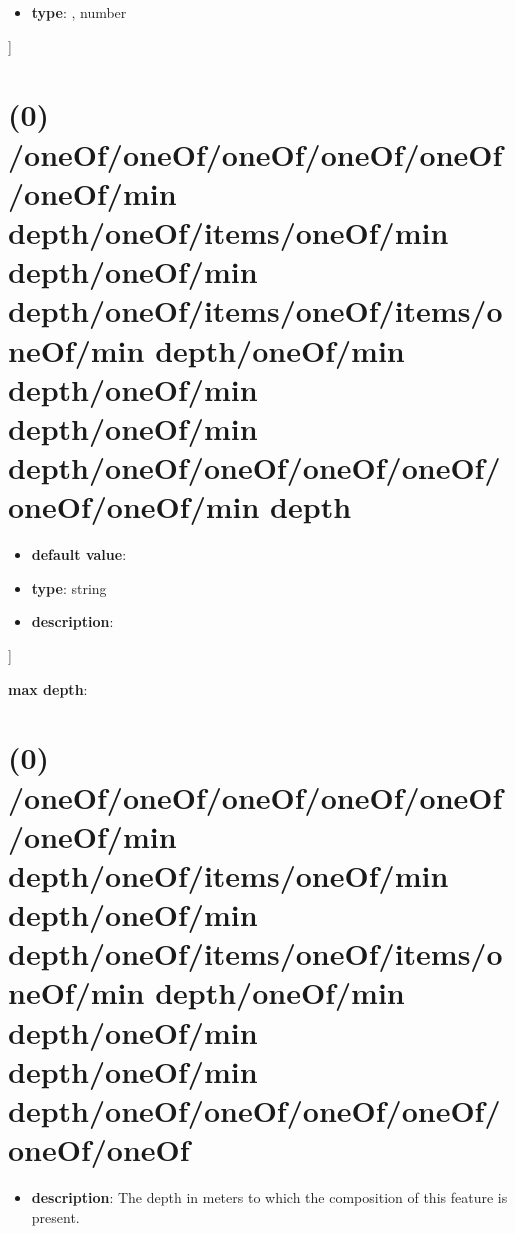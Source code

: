 \begin{itemize}[leftmargin=5em]\item {\bf type}: , number\end{itemize}]\section{(0) /oneOf/oneOf/oneOf/oneOf/oneOf/oneOf/min depth/oneOf/items/oneOf/min depth/oneOf/min depth/oneOf/items/oneOf/items/oneOf/min depth/oneOf/min depth/oneOf/min depth/oneOf/min depth/oneOf/oneOf/oneOf/oneOf/oneOf/oneOf/min depth}
\begin{itemize}[leftmargin=0em]\item {\bf default value}: 
\item {\bf type}: string
\item {\bf description}: 
\end{itemize}]\item {\bf max depth}: \section{(0) /oneOf/oneOf/oneOf/oneOf/oneOf/oneOf/min depth/oneOf/items/oneOf/min depth/oneOf/min depth/oneOf/items/oneOf/items/oneOf/min depth/oneOf/min depth/oneOf/min depth/oneOf/min depth/oneOf/oneOf/oneOf/oneOf/oneOf/oneOf}
\begin{itemize}[leftmargin=0em]\item {\bf description}: The depth in meters to which the composition of this feature is present.
\end{itemize}
